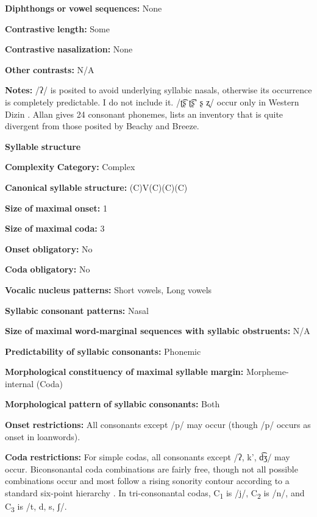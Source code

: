 \begin{styleBody}
\textbf{Diphthongs} \textbf{or} \textbf{vowel} \textbf{sequences:} None

\textbf{Contrastive} \textbf{length:} Some

\textbf{Contrastive} \textbf{nasalization:} None

\textbf{Other} \textbf{contrasts:} N/A

\textbf{Notes:} /ʔ/ is posited to avoid underlying syllabic nasals, otherwise its occurrence is completely predictable. I do not include it. /ʈ͡ʂ ʈ͡ʂ’ ʂ ʐ/ occur only in Western Dizin \citep{Beachy2005}. Allan gives 24 consonant phonemes, lists an inventory that is quite divergent from those posited by Beachy and Breeze.

\textbf{Syllable} \textbf{structure}

\textbf{Complexity} \textbf{Category:} Complex

\textbf{Canonical} \textbf{syllable} \textbf{structure:} (C)V(C)(C)(C) \citep[38-46]{Beachy2005}

\textbf{Size} \textbf{of} \textbf{maximal} \textbf{onset:} 1

\textbf{Size} \textbf{of} \textbf{maximal} \textbf{coda:} 3

\textbf{Onset} \textbf{obligatory:} No

\textbf{Coda} \textbf{obligatory:} No

\textbf{Vocalic} \textbf{nucleus} \textbf{patterns:} Short vowels, Long vowels

\textbf{Syllabic} \textbf{consonant} \textbf{patterns:} Nasal

\textbf{Size} \textbf{of} \textbf{maximal} \textbf{word{}-marginal sequences with syllabic obstruents:} N/A

\textbf{Predictability} \textbf{of} \textbf{syllabic} \textbf{consonants:} Phonemic

\textbf{Morphological} \textbf{constituency} \textbf{of} \textbf{maximal} \textbf{syllable} \textbf{margin:} Morpheme-internal (Coda)

\textbf{Morphological} \textbf{pattern} \textbf{of} \textbf{syllabic} \textbf{consonants:} Both

\textbf{Onset} \textbf{restrictions:} All consonants except /p/ may occur (though /p/ occurs as onset in loanwords).

\textbf{Coda} \textbf{restrictions:} For simple codas, all consonants except /ʔ, k’, d͡ʒ/ may occur. Biconsonantal coda combinations are fairly free, though not all possible combinations occur and most follow a rising sonority contour according to a standard six-point hierarchy . In tri-consonantal codas, C\textsubscript{1} is /j/, C\textsubscript{2} is /n/, and C\textsubscript{3} is /t, d, s, ʃ/.


\end{styleBody}

